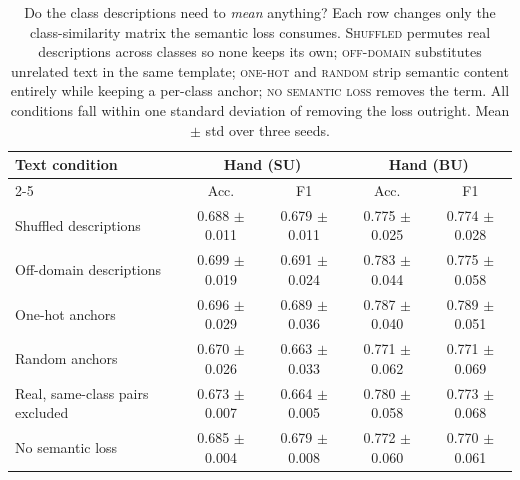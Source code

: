 \begin{table}[t]
\centering
\small
\begin{tabular}{lcccc}
\toprule
Text condition & \multicolumn{2}{c}{Hand (SU)} & \multicolumn{2}{c}{Hand (BU)} \\
\cmidrule(lr){2-5}
 & Acc. & F1 & Acc. & F1 \\
\midrule
Shuffled descriptions & 0.688 $\pm$ 0.011 & 0.679 $\pm$ 0.011 & 0.775 $\pm$ 0.025 & 0.774 $\pm$ 0.028 \\
Off-domain descriptions & 0.699 $\pm$ 0.019 & 0.691 $\pm$ 0.024 & 0.783 $\pm$ 0.044 & 0.775 $\pm$ 0.058 \\
One-hot anchors & 0.696 $\pm$ 0.029 & 0.689 $\pm$ 0.036 & 0.787 $\pm$ 0.040 & 0.789 $\pm$ 0.051 \\
Random anchors & 0.670 $\pm$ 0.026 & 0.663 $\pm$ 0.033 & 0.771 $\pm$ 0.062 & 0.771 $\pm$ 0.069 \\
Real, same-class pairs excluded & 0.673 $\pm$ 0.007 & 0.664 $\pm$ 0.005 & 0.780 $\pm$ 0.058 & 0.773 $\pm$ 0.068 \\
No semantic loss & 0.685 $\pm$ 0.004 & 0.679 $\pm$ 0.008 & 0.772 $\pm$ 0.060 & 0.770 $\pm$ 0.061 \\
\bottomrule
\end{tabular}
\caption{Do the class descriptions need to \emph{mean} anything? Each row changes only the class-similarity matrix the semantic loss consumes. \textsc{Shuffled} permutes real descriptions across classes so none keeps its own; \textsc{off-domain} substitutes unrelated text in the same template; \textsc{one-hot} and \textsc{random} strip semantic content entirely while keeping a per-class anchor; \textsc{no semantic loss} removes the term. All conditions fall within one standard deviation of removing the loss outright. Mean $\pm$ std over three seeds.}
\label{tab:tier1}
\end{table}

